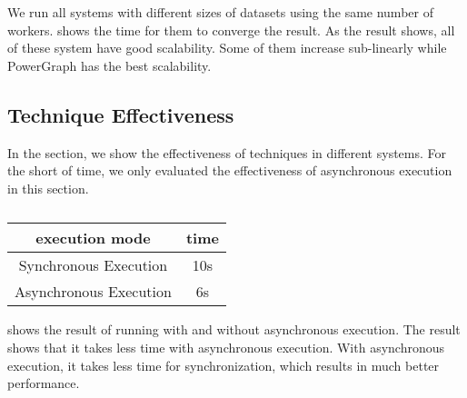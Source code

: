 We run all systems with different sizes of datasets using
the same number of workers.  shows the time
for them to converge the result. As the result shows,
all of these system have good scalability. Some of them increase
sub-linearly while PowerGraph has the best scalability.


\subsection{Technique Effectiveness} \label{subsec:technique}
In the section, we show the effectiveness of techniques in
different systems. For the short of time, we only evaluated
the effectiveness of asynchronous execution in this section.

\begin{table}
  \begin{tabular}{c|c}
    \hline
    \textbf{execution mode} & \textbf{time} \\
    \hline
    Synchronous Execution & 10s \\
    \hline
    Asynchronous Execution & 6s
  \end{tabular}
  \caption{}
  \label{tab:asyn}

\end{table}

 shows the result of running with and without asynchronous
execution. The result shows that it takes less time with asynchronous
execution. With asynchronous execution, it takes less time for synchronization,
which results in much better performance.

